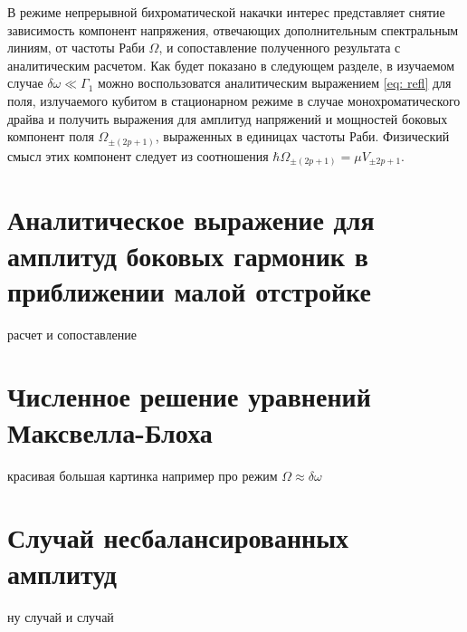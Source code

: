 В режиме непрерывной бихроматической накачки интерес представляет снятие зависимость компонент напряжения, отвечающих дополнительным спектральным линиям, от частоты Раби $\Omega$, и сопоставление  полученного результата с аналитическим расчетом. Как будет показано в следующем разделе, в изучаемом случае $\delta\omega \ll \Gamma_1$ можно воспользоватся аналитическим выражением \eqref{eq: refl} для поля, излучаемого кубитом в стационарном режиме в случае монохроматического драйва и получить выражения для амплитуд напряжений и мощностей боковых компонент поля $\Omega_{\pm(2p+1)}$, выраженных в единицах частоты Раби. Физический смысл этих компонент следует из соотношения $\hbar\Omega_{\pm(2p+1)} = \mu V_{\pm{2p+1}}$. 

\section{Аналитическое выражение для амплитуд боковых гармоник в приближении малой отстройке}
расчет и сопоставление
\section{Численное решение уравнений Максвелла-Блоха}
красивая большая картинка например про режим $\Omega \approx \delta \omega$
\section{Случай несбалансированных амплитуд}
 ну случай и случай